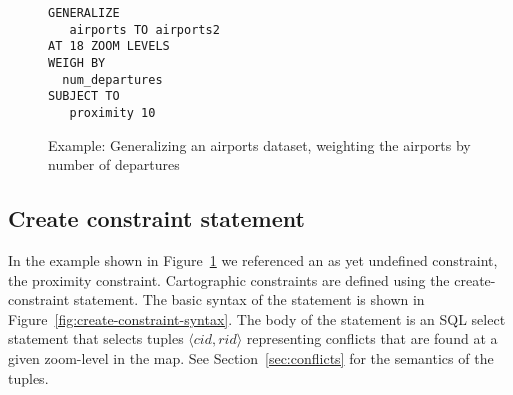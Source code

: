 

\begin{figure}[htbp]
\begin{center}
\begin{lstlisting}
GENERALIZE 
   airports TO airports2
AT 18 ZOOM LEVELS
WEIGH BY
  num_departures
SUBJECT TO 
   proximity 10 
\end{lstlisting}
\caption{Example: Generalizing an airports dataset, weighting the airports by number of departures}
\label{fig:cvl-example-airports}
\end{center}
\end{figure}





\subsection{Create constraint statement}
\label{sec:create-constraint-statement}

In the example shown in Figure~\ref{fig:cvl-example-airports} we referenced an as yet undefined constraint, the proximity constraint. Cartographic constraints are defined using the create-constraint statement.  The basic syntax of the statement is shown in Figure~\ref{fig:create-constraint-syntax}. The body of the statement is an SQL select statement that selects tuples $\langle cid, rid\rangle$ representing conflicts that are found at a given zoom-level in the map. See Section~\ref{sec:conflicts} for the semantics of the tuples.

